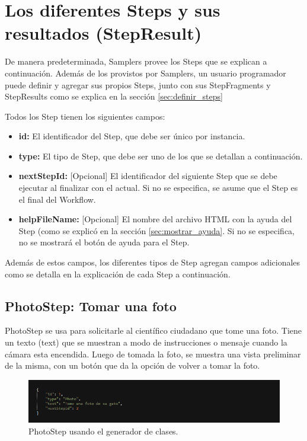 \chapter{Los diferentes Steps y sus resultados (StepResult)} \label{sec:steps_detallados}
De manera predeterminada, Samplers provee los Steps que se explican a continuación. Además de los provistos por Samplers, un usuario programador puede definir y agregar sus propios Steps, junto con sus StepFragments y StepResults como se explica en la sección \ref{sec:definir_steps} 

Todos los Step tienen los siguientes campos:

\begin{itemize}
\item \textbf{id:} El identificador del Step, que debe ser único por instancia.
\item \textbf{type:} El tipo de Step, que debe ser uno de los que se detallan a continuación.
\item \textbf{nextStepId:} [Opcional] El identificador del siguiente Step que se debe ejecutar al finalizar con el actual. Si no se especifica, se asume que el Step es el final del Workflow.
\item \textbf{helpFileName:} [Opcional] El nombre del archivo HTML con la ayuda del Step (como se explicó en la sección \ref{sec:mostrar_ayuda}. Si no se especifica, no se mostrará el botón de ayuda para el Step.
\end{itemize}

Además de estos campos, los diferentes tipos de Step agregan campos adicionales como se detalla en la explicación de cada Step a continuación.


\section{PhotoStep: Tomar una foto}
PhotoStep se usa para solicitarle al científico ciudadano que tome una foto. Tiene un texto (text) que se muestran a modo de instrucciones o mensaje cuando la cámara esta encendida. Luego de tomada la foto, se muestra una vista preliminar de la misma, con un botón que da la opción de volver a tomar la foto.

\begin{figure}[H]
  \centering
    \includegraphics[scale=0.6]{50-anexos/C-steps/photo_json.png} 
    \caption{PhotoStep usando el generador de clases.}
\end{figure}	

